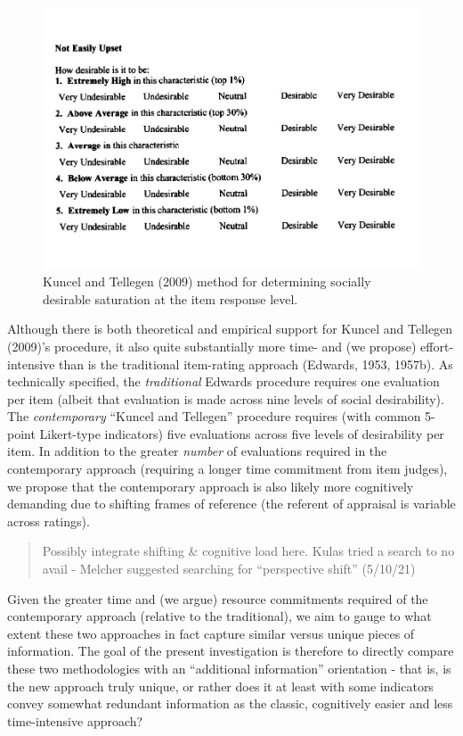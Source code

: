 \documentclass[
  ,man]{apa6}
\begin{document}
\begin{figure}
\centering
\includegraphics{KuncelTellegen_files/figure-latex/Figure1-1.pdf}
\caption{\label{fig:Figure1}Kuncel and Tellegen (2009) method for determining socially desirable saturation at the item response level.}
\end{figure}

Although there is both theoretical and empirical support for Kuncel and Tellegen (2009)'s procedure, it also quite substantially more time- and (we propose) effort-intensive than is the traditional item-rating approach (Edwards, 1953, 1957b). As technically specified, the \emph{traditional} Edwards procedure requires one evaluation per item (albeit that evaluation is made across nine levels of social desirability). The \emph{contemporary} ``Kuncel and Tellegen'' procedure requires (with common 5-point Likert-type indicators) five evaluations across five levels of desirability per item. In addition to the greater \emph{number} of evaluations required in the contemporary approach (requiring a longer time commitment from item judges), we propose that the contemporary approach is also likely more cognitively demanding due to shifting frames of reference (the referent of appraisal is variable across ratings).

\begin{quote}
Possibly integrate shifting \& cognitive load here. Kulas tried a search to no avail - Melcher suggested searching for ``perspective shift'' (5/10/21)
\end{quote}

Given the greater time and (we argue) resource commitments required of the contemporary approach (relative to the traditional), we aim to gauge to what extent these two approaches in fact capture similar versus unique pieces of information. The goal of the present investigation is therefore to directly compare these two methodologies with an ``additional information'' orientation - that is, is the new approach truly unique, or rather does it at least with some indicators convey somewhat redundant information as the classic, cognitively easier and less time-intensive approach?
\end{document}

